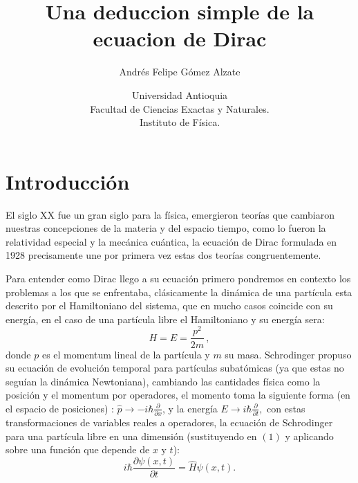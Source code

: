 \documentclass[twocolumn]{article}
\title{Una deduccion simple de la ecuacion de Dirac}
\author{Andrés Felipe Gómez Alzate }
\date{Universidad Antioquia\\ Facultad de Ciencias Exactas y Naturales.\\ Instituto de Física.}
\begin{document}

\section{Introducción}
El siglo XX fue un gran siglo para la física, emergieron teorías que cambiaron nuestras concepciones de la materia y del espacio tiempo, como lo fueron la relatividad especial y la mecánica cuántica, la ecuación de Dirac formulada en 1928 precisamente une por primera vez estas dos teorías congruentemente.

Para entender como Dirac llego a su ecuación primero pondremos en contexto los problemas a los que se enfrentaba, clásicamente la dinámica de una partícula esta descrito por el Hamiltoniano del sistema, que en mucho casos coincide con su energía, en el caso de una partícula libre el Hamiltoniano y su energía sera:
\begin{equation}
    H=E=\frac{p^2}{2m} \,,
\end{equation}
donde $p$ es el momentum lineal de la partícula y $m$ su masa. Schrodinger propuso su ecuación de evolución temporal para partículas subatómicas (ya que estas no seguían la dinámica Newtoniana), cambiando las cantidades física como la posición y el momentum por operadores, el momento toma la siguiente forma (en el espacio de posiciones) : $\hat{p} \rightarrow -i\hbar \frac{\partial}{\partial x}$, y la energía $E \rightarrow i\hbar\frac{\partial}{\partial t},$ con estas transformaciones de variables reales a operadores, la  ecuación de Schrodinger para una partícula libre en una dimensión (sustituyendo en $(1)$ y aplicando sobre una función que depende de $x$ y $t$):
\begin{equation}
    i\hbar \frac{\partial\psi(x,t)}{\partial t}=\hat{H}\psi(x,t) .
\end{equation}
\end{document}
